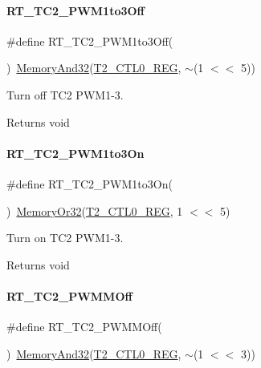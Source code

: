 \paragraph{\texorpdfstring{R\+T\+\_\+\+T\+C2\+\_\+\+P\+W\+M1to3\+Off}{RT\_TC2\_PWM1to3Off}}
{\footnotesize\ttfamily \#define R\+T\+\_\+\+T\+C2\+\_\+\+P\+W\+M1to3\+Off(\begin{DoxyParamCaption}{ }\end{DoxyParamCaption})~\mbox{\hyperlink{a00026_ad87cedffcaadc51db22594fce55173d4}{Memory\+And32}}(\mbox{\hyperlink{a00026_a5853553391e986211306d4f29ab31e47}{T2\+\_\+\+C\+T\+L0\+\_\+\+R\+EG}}, $\sim$(1 $<$$<$ 5))}



Turn off T\+C2 P\+W\+M1-\/3. 

\begin{DoxyReturn}{Returns}
void 
\end{DoxyReturn}
\mbox{\label{a00083_adc090dee2463a2a27b57234e63f0c0b5}} 
\paragraph{\texorpdfstring{R\+T\+\_\+\+T\+C2\+\_\+\+P\+W\+M1to3\+On}{RT\_TC2\_PWM1to3On}}
{\footnotesize\ttfamily \#define R\+T\+\_\+\+T\+C2\+\_\+\+P\+W\+M1to3\+On(\begin{DoxyParamCaption}{ }\end{DoxyParamCaption})~\mbox{\hyperlink{a00026_a27874a97deab7cecdde5ddecf466e31e}{Memory\+Or32}}(\mbox{\hyperlink{a00026_a5853553391e986211306d4f29ab31e47}{T2\+\_\+\+C\+T\+L0\+\_\+\+R\+EG}}, 1 $<$$<$ 5)}



Turn on T\+C2 P\+W\+M1-\/3. 

\begin{DoxyReturn}{Returns}
void 
\end{DoxyReturn}
\mbox{\label{a00083_abe6d0acfd60eb7058f0622de867c5b87}} 
\paragraph{\texorpdfstring{R\+T\+\_\+\+T\+C2\+\_\+\+P\+W\+M\+M\+Off}{RT\_TC2\_PWMMOff}}
{\footnotesize\ttfamily \#define R\+T\+\_\+\+T\+C2\+\_\+\+P\+W\+M\+M\+Off(\begin{DoxyParamCaption}{ }\end{DoxyParamCaption})~\mbox{\hyperlink{a00026_ad87cedffcaadc51db22594fce55173d4}{Memory\+And32}}(\mbox{\hyperlink{a00026_a5853553391e986211306d4f29ab31e47}{T2\+\_\+\+C\+T\+L0\+\_\+\+R\+EG}}, $\sim$(1 $<$$<$ 3))}



